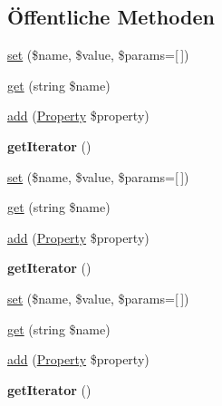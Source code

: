 \subsection*{Öffentliche Methoden}
\begin{DoxyCompactItemize}
\item 
\mbox{\hyperlink{class_eluceo_1_1i_cal_1_1_property_bag_a9989104b8eca7b8bb91368c1c7f92c96}{set}} (\$name, \$value, \$params=\mbox{[}$\,$\mbox{]})
\item 
\mbox{\hyperlink{class_eluceo_1_1i_cal_1_1_property_bag_ab4e772a7ba80e988e259e4daacf50e76}{get}} (string \$name)
\item 
\mbox{\hyperlink{class_eluceo_1_1i_cal_1_1_property_bag_a285b4d352bd4b646096b00189461272d}{add}} (\mbox{\hyperlink{class_eluceo_1_1i_cal_1_1_property}{Property}} \$property)
\item 
\mbox{\label{class_eluceo_1_1i_cal_1_1_property_bag_a2fe8e3b3598e30cc0c7a1658081f325d}} 
{\bfseries get\+Iterator} ()
\item 
\mbox{\hyperlink{class_eluceo_1_1i_cal_1_1_property_bag_a9989104b8eca7b8bb91368c1c7f92c96}{set}} (\$name, \$value, \$params=\mbox{[}$\,$\mbox{]})
\item 
\mbox{\hyperlink{class_eluceo_1_1i_cal_1_1_property_bag_ab4e772a7ba80e988e259e4daacf50e76}{get}} (string \$name)
\item 
\mbox{\hyperlink{class_eluceo_1_1i_cal_1_1_property_bag_a285b4d352bd4b646096b00189461272d}{add}} (\mbox{\hyperlink{class_eluceo_1_1i_cal_1_1_property}{Property}} \$property)
\item 
\mbox{\label{class_eluceo_1_1i_cal_1_1_property_bag_a2fe8e3b3598e30cc0c7a1658081f325d}} 
{\bfseries get\+Iterator} ()
\item 
\mbox{\hyperlink{class_eluceo_1_1i_cal_1_1_property_bag_a9989104b8eca7b8bb91368c1c7f92c96}{set}} (\$name, \$value, \$params=\mbox{[}$\,$\mbox{]})
\item 
\mbox{\hyperlink{class_eluceo_1_1i_cal_1_1_property_bag_ab4e772a7ba80e988e259e4daacf50e76}{get}} (string \$name)
\item 
\mbox{\hyperlink{class_eluceo_1_1i_cal_1_1_property_bag_a285b4d352bd4b646096b00189461272d}{add}} (\mbox{\hyperlink{class_eluceo_1_1i_cal_1_1_property}{Property}} \$property)
\item 
\mbox{\label{class_eluceo_1_1i_cal_1_1_property_bag_a2fe8e3b3598e30cc0c7a1658081f325d}} 
{\bfseries get\+Iterator} ()
\end{DoxyCompactItemize}
